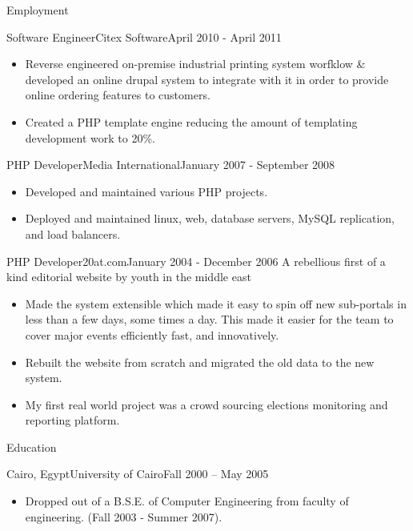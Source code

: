 \documentclass[]{mcdowellcv}
\begin{document}
\begin{cvsection}{Employment}
		\begin{cvsubsection}{Software Engineer}{Citex Software}{April 2010 - April 2011}
			\begin{itemize}
				\item Reverse engineered on-premise industrial printing system worfklow \& developed an online drupal system to integrate with it in order to provide online ordering features to customers.
				\item Created a PHP template engine reducing the amount of templating development work to 20\%.
			\end{itemize}
		\end{cvsubsection}
		
		\begin{cvsubsection}{PHP Developer}{Media International}{January 2007 - September 2008}
			\begin{itemize}
				\item Developed and maintained various PHP projects.
                \item Deployed and maintained linux, web, database servers, MySQL replication, and load balancers.
			\end{itemize}
		\end{cvsubsection}
		
		\begin{cvsubsection}{PHP Developer}{20at.com}{January 2004 - December 2006}
			A rebellious first of a kind editorial website by youth in the middle east
			\begin{itemize}
				\item Made the system extensible which made it easy to spin off new sub-portals in less than a few days, some times a day. This made it easier for the team to cover major events efficiently fast, and innovatively.				
				\item Rebuilt the website from scratch and migrated the old data to the new system.
				\item My first real world project was a crowd sourcing elections monitoring and reporting platform.
			\end{itemize}
		\end{cvsubsection}
		
	\end{cvsection}
	
	\begin{cvsection}{Education}
		\begin{cvsubsection}{Cairo, Egypt}{University of Cairo}{Fall 2000 -- May 2005}
			\begin{itemize}
				\item Dropped out of a B.S.E. of Computer Engineering from faculty of engineering. (Fall 2003 - Summer 2007).
			\end{itemize}
		\end{cvsubsection}
	\end{cvsection}
\end{document}
